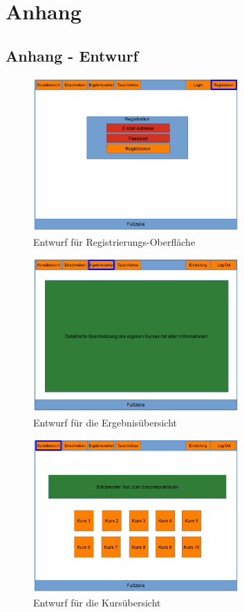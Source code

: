 \clearpage
\chapter{Anhang}
\label{chapter:appendix}
    \section{Anhang - Entwurf}
        \begin{figure}[t]
            \centering
            \includegraphics[width=0.7\textwidth]{./design/MockUpsFrontend/frontendRegistration.png}
            \caption{Entwurf für Registrierungs-Oberfläche}
            \label{mockupRegistrationFrontend}
        \end{figure}
    
        \begin{figure}[t]
            \centering
            \includegraphics[width=0.7\textwidth]{./design/MockUpsFrontend/frontendResults.png}
            \caption{Entwurf für die Ergebnisübersicht}
            \label{mockupResultsFrontend}
        \end{figure}
    
        \begin{figure}[t]
            \centering
            \includegraphics[width=0.7\textwidth]{./design/MockUpsFrontend/frontendCourses.png}
            \caption{Entwurf für die Kursübersicht}
            \label{mockupCoursesFrontend}
        \end{figure}